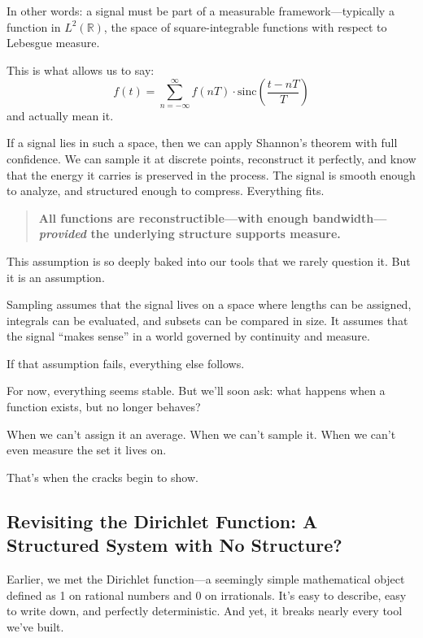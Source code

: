 In other words: a signal must be part of a measurable framework—typically a function in \( L^2(\mathbb{R}) \), the space of square-integrable functions with respect to Lebesgue measure.

This is what allows us to say:
\[
f(t) = \sum_{n=-\infty}^{\infty} f(nT) \cdot \text{sinc}\left(\frac{t - nT}{T}\right)
\]
and actually mean it.

If a signal lies in such a space, then we can apply Shannon’s theorem with full confidence. We can sample it at discrete points, reconstruct it perfectly, and know that the energy it carries is preserved in the process. The signal is smooth enough to analyze, and structured enough to compress. Everything fits.

\begin{quote}
\textbf{All functions are reconstructible—with enough bandwidth—\emph{provided} the underlying structure supports measure.}
\end{quote}

This assumption is so deeply baked into our tools that we rarely question it. But it is an assumption.

Sampling assumes that the signal lives on a space where lengths can be assigned, integrals can be evaluated, and subsets can be compared in size. It assumes that the signal “makes sense” in a world governed by continuity and measure.

If that assumption fails, everything else follows.

\medskip

\noindent
For now, everything seems stable. But we’ll soon ask: what happens when a function exists, but no longer behaves?

When we can’t assign it an average.  
When we can’t sample it.  
When we can’t even measure the set it lives on.

That’s when the cracks begin to show.




\subsection{Revisiting the Dirichlet Function: A Structured System with No Structure?}

Earlier, we met the Dirichlet function—a seemingly simple mathematical object defined as 1 on rational numbers and 0 on irrationals. It’s easy to describe, easy to write down, and perfectly deterministic. And yet, it breaks nearly every tool we’ve built.

